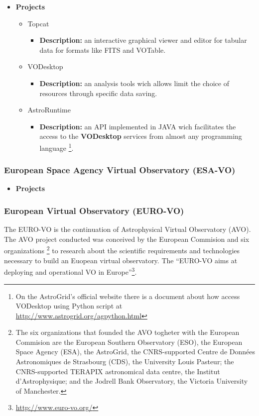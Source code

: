 \begin{itemize}
\item \textbf{Projects}
\begin{itemize}
\item Topcat
\begin{itemize}
\item \textbf{Description:} an interactive graphical viewer and editor for
tabular data for formats like FITS and VOTable.
\end{itemize}
\item VODesktop
\begin{itemize}
\item \textbf{Description:} an analysis tools wich allows limit the choice of
resources through specific data saving.
\end{itemize}
\item AstroRuntime
\begin{itemize}
\item \textbf{Description:} an API implemented in JAVA wich facilitates the
access to the \textbf{VODesktop} services from almost any programming language
\footnote{On the AstroGrid's official website there is a document about how
access VODesktop using Python script at
\url{http://www.astrogrid.org/agpython.html}}.
\end{itemize}
\end{itemize}
\end{itemize}

\subsubsection{European Space Agency Virtual Observatory (ESA-VO)}
\begin{itemize}
\item \textbf{Projects}
\end{itemize}

\subsubsection{European Virtual Observatory (EURO-VO)}
The EURO-VO is the continuation of Astrophysical Virtual Observatory (AVO). The
AVO project conducted was conceived by the European Commision and six
organizations \footnote{The six organizations that founded the AVO togheter with
the European Commision are the European Southern Observatory (ESO), the European
Space Agency (ESA), the AstroGrid, the CNRS-supported Centre de Données
Astronomiques de Strasbourg (CDS), the University Louis Pasteur; the
CNRS-supported TERAPIX astronomical data centre, the Institut d'Astrophysique;
and the Jodrell Bank Observatory, the Victoria University of Manchester.} to
research about the scientific requirements and technologies necessary to build
an Euopean virtual observatory. The ``EURO-VO aims at deploying and operational
VO in Europe''\footnote{\url{http://www.euro-vo.org/}}.\\

